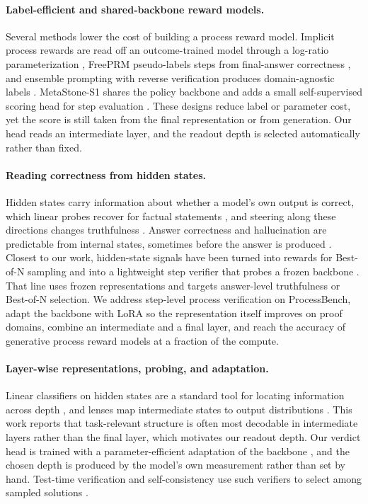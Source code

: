 \paragraph{Label-efficient and shared-backbone reward models.}
Several methods lower the cost of building a process reward model. Implicit process rewards are read off an outcome-trained model through a log-ratio parameterization \citep{yuan2024free}, FreePRM pseudo-labels steps from final-answer correctness \citep{sun2025freeprm}, and ensemble prompting with reverse verification produces domain-agnostic labels \citep{tan2025aurora}. MetaStone-S1 shares the policy backbone and adds a small self-supervised scoring head for step evaluation \citep{wang2025metastone}. These designs reduce label or parameter cost, yet the score is still taken from the final representation or from generation. Our head reads an intermediate layer, and the readout depth is selected automatically rather than fixed.

\paragraph{Reading correctness from hidden states.}
Hidden states carry information about whether a model's own output is correct, which linear probes recover for factual statements \citep{azaria2023internal, kadavath2022language, burns2022discovering, marks2023geometry}, and steering along these directions changes truthfulness \citep{li2023inference}. Answer correctness and hallucination are predictable from internal states, sometimes before the answer is produced \citep{orgad2024llms, liu2024universal, cencerrado2025noanswer}. Closest to our work, hidden-state signals have been turned into rewards for Best-of-N sampling \citep{guo2025mining} and into a lightweight step verifier that probes a frozen backbone \citep{ni2025reprobe}. That line uses frozen representations and targets answer-level truthfulness or Best-of-N selection. We address step-level process verification on ProcessBench, adapt the backbone with LoRA so the representation itself improves on proof domains, combine an intermediate and a final layer, and reach the accuracy of generative process reward models at a fraction of the compute.

\paragraph{Layer-wise representations, probing, and adaptation.}
Linear classifiers on hidden states are a standard tool for locating information across depth \citep{alain2016understanding}, and lenses map intermediate states to output distributions \citep{belrose2023eliciting}. This work reports that task-relevant structure is often most decodable in intermediate layers rather than the final layer, which motivates our readout depth. Our verdict head is trained with a parameter-efficient adaptation of the backbone \citep{hu2021lora}, and the chosen depth is produced by the model's own measurement rather than set by hand. Test-time verification and self-consistency use such verifiers to select among sampled solutions \citep{wang2022selfconsistency}.
